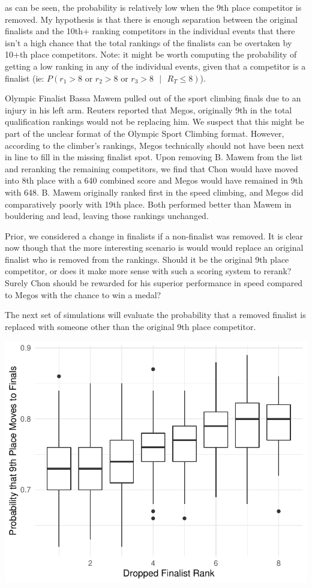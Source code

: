 \documentclass[12pt]{article}
\begin{document}
as can be seen, the probability is relatively low when the 9th place
competitor is removed. My hypothesis is that there is enough separation
between the original finalists and the 10th+ ranking competitors in the
individual events that there isn't a high chance that the total rankings
of the finalists can be overtaken by 10+th place competitors. Note: it
might be worth computing the probability of getting a low ranking in any
of the individual events, given that a competitor is a finalist (ie:
\(P(r_1 > 8 \text{ or } r_2 > 8 \text{ or } r_3 > 8 \text{ }|\text{ } R_T \leq 8)\)).

Olympic Finalist Bassa Mawem pulled out of the sport climbing finals due
to an injury in his left arm. Reuters reported that Megos, originally
9th in the total qualification rankings would not be replacing him. We
suspect that this might be part of the unclear format of the Olympic
Sport Climbing format. However, according to the climber's rankings,
Megos technically should not have been next in line to fill in the
missing finalist spot. Upon removing B. Mawem from the list and
reranking the remaining competitors, we find that Chon would have moved
into 8th place with a 640 combined score and Megos would have remained
in 9th with 648. B. Mawem originally ranked first in the speed climbing,
and Megos did comparatively poorly with 19th place. Both performed
better than Mawem in bouldering and lead, leaving those rankings
unchanged.

Prior, we considered a change in finalists if a non-finalist was
removed. It is clear now though that the more interesting scenario is
would would replace an original finalist who is removed from the
rankings. Should it be the original 9th place competitor, or does it
make more sense with such a scoring system to rerank? Surely Chon should
be rewarded for his superior performance in speed compared to Megos with
the chance to win a medal?

The next set of simulations will evaluate the probability that a removed
finalist is replaced with someone other than the original 9th place
competitor.

\begin{center}\includegraphics{draft_files/figure-latex/unnamed-chunk-14-1} \end{center}
\end{document}
